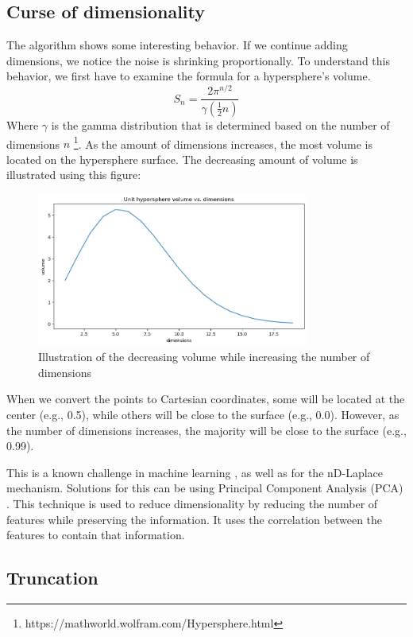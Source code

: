 \subsection{Curse of dimensionality}
The algorithm shows some interesting behavior.
If we continue adding dimensions, we notice the noise is shrinking proportionally.
To understand this behavior, we first have to examine the formula for a hypersphere’s volume.
\begin{equation}
  S_n = \frac{2 \pi^{n/2}}{\gamma(\frac{1}{2}n)}
\end{equation}
Where $\gamma$ is the gamma distribution that is determined based on the number of dimensions $n$ \footnote{https://mathworld.wolfram.com/Hypersphere.html}.
As the amount of dimensions increases, the most volume is located on the hypersphere surface.
The decreasing amount of volume is illustrated using this figure:
\begin{figure}[ht]
  \label{fig:curse-of-dimensionality}
  \includegraphics[width=0.8\textwidth]{TheorethicalFramework/ND-Laplace/Images/volume.png}
  \caption{Illustration of the decreasing volume while increasing the number of dimensions}
\end{figure}
When we convert the points to Cartesian coordinates, some will be located at the center (e.g., 0.5), while others will be close to the surface (e.g., 0.0).
However, as the number of dimensions increases, the majority will be close to the surface (e.g., 0.99).

This is a known challenge in machine learning , as well as for the nD-Laplace mechanism.
Solutions for this can be using Principal Component Analysis (PCA) \citep{gorban_high-dimensional_2020}.
This technique is used to reduce dimensionality by reducing the number of features while preserving the information.
It uses the correlation between the features to contain that information.

\subsection{Truncation}
